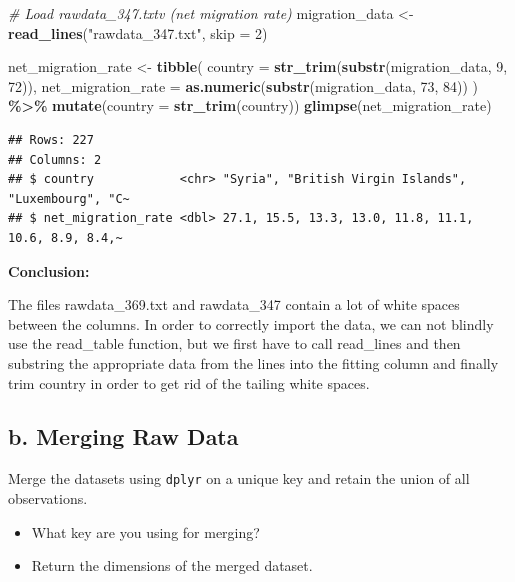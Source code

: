 \documentclass[
]{article}
\newenvironment{Shaded}{\begin{snugshade}}{\end{snugshade}}
\newcommand{\AttributeTok}[1]{\textcolor[rgb]{0.13,0.29,0.53}{#1}}
\newcommand{\CommentTok}[1]{\textcolor[rgb]{0.56,0.35,0.01}{\textit{#1}}}
\newcommand{\DecValTok}[1]{\textcolor[rgb]{0.00,0.00,0.81}{#1}}
\newcommand{\FunctionTok}[1]{\textcolor[rgb]{0.13,0.29,0.53}{\textbf{#1}}}
\newcommand{\NormalTok}[1]{#1}
\newcommand{\OtherTok}[1]{\textcolor[rgb]{0.56,0.35,0.01}{#1}}
\newcommand{\SpecialCharTok}[1]{\textcolor[rgb]{0.81,0.36,0.00}{\textbf{#1}}}
\newcommand{\StringTok}[1]{\textcolor[rgb]{0.31,0.60,0.02}{#1}}
\providecommand{\tightlist}{%
  \setlength{\itemsep}{0pt}\setlength{\parskip}{0pt}}
\begin{document}
\begin{Shaded}
\begin{Highlighting}[]
\CommentTok{\# Load rawdata\_347.txtv (net migration rate)}
\NormalTok{migration\_data }\OtherTok{\textless{}{-}} \FunctionTok{read\_lines}\NormalTok{(}\StringTok{"rawdata\_347.txt"}\NormalTok{, }\AttributeTok{skip =} \DecValTok{2}\NormalTok{)}

\NormalTok{net\_migration\_rate }\OtherTok{\textless{}{-}} \FunctionTok{tibble}\NormalTok{(}
  \AttributeTok{country =} \FunctionTok{str\_trim}\NormalTok{(}\FunctionTok{substr}\NormalTok{(migration\_data, }\DecValTok{9}\NormalTok{, }\DecValTok{72}\NormalTok{)),}
  \AttributeTok{net\_migration\_rate =} \FunctionTok{as.numeric}\NormalTok{(}\FunctionTok{substr}\NormalTok{(migration\_data, }\DecValTok{73}\NormalTok{, }\DecValTok{84}\NormalTok{))}
\NormalTok{) }\SpecialCharTok{\%\textgreater{}\%}
  \FunctionTok{mutate}\NormalTok{(}\AttributeTok{country =} \FunctionTok{str\_trim}\NormalTok{(country))}
\FunctionTok{glimpse}\NormalTok{(net\_migration\_rate)}
\end{Highlighting}
\end{Shaded}

\begin{verbatim}
## Rows: 227
## Columns: 2
## $ country            <chr> "Syria", "British Virgin Islands", "Luxembourg", "C~
## $ net_migration_rate <dbl> 27.1, 15.5, 13.3, 13.0, 11.8, 11.1, 10.6, 8.9, 8.4,~
\end{verbatim}

\textbf{Conclusion:}

The files rawdata\_369.txt and rawdata\_347 contain a lot of white
spaces between the columns. In order to correctly import the data, we
can not blindly use the read\_table function, but we first have to call
read\_lines and then substring the appropriate data from the lines into
the fitting column and finally trim country in order to get rid of the
tailing white spaces.

\subsection{b. Merging Raw Data}\label{b.-merging-raw-data}

Merge the datasets using \texttt{dplyr} on a unique key and retain the
union of all observations.

\begin{itemize}
\tightlist
\item
  What key are you using for merging?
\item
  Return the dimensions of the merged dataset.
\end{itemize}
\end{document}
